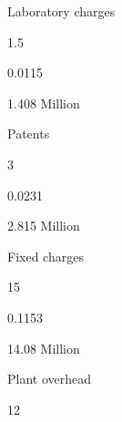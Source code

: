 \documentclass[a4paper,portrait,12pt]{article}
\begin{document}
\begin{flushleft}
Laboratory charges
\end{flushleft}





1.5





0.0115





\begin{flushleft}
1.408 Million
\end{flushleft}





\begin{flushleft}
Patents
\end{flushleft}





3





0.0231





\begin{flushleft}
2.815 Million
\end{flushleft}





\begin{flushleft}
Fixed charges
\end{flushleft}





15





0.1153





\begin{flushleft}
14.08 Million
\end{flushleft}





\begin{flushleft}
Plant overhead
\end{flushleft}





12
\end{document}
